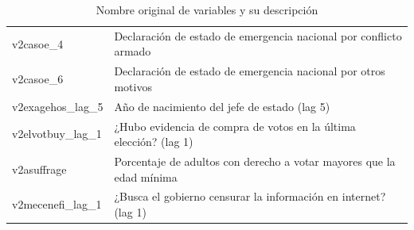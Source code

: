 \documentclass{article}
\begin{document}
\begin{table}[H]
\begin{tabular}{ll}
    v2casoe\_4 & Declaración de estado de emergencia nacional por conflicto armado \\
    v2casoe\_6 & Declaración de estado de emergencia nacional por otros motivos \\
    v2exagehos\_lag\_5 & Año de nacimiento del jefe de estado (lag 5) \\
    v2elvotbuy\_lag\_1 & ¿Hubo evidencia de compra de votos en la última elección? (lag 1) \\
    v2asuffrage & Porcentaje de adultos con derecho a votar mayores que la edad mínima \\
    v2mecenefi\_lag\_1 & ¿Busca el gobierno censurar la información en internet? (lag 1) \\
    \bottomrule
    \end{tabular}
  \caption{Nombre original de variables y su descripción \label{tab:vars}}
\end{table}

\printbibliography
\end{document}
